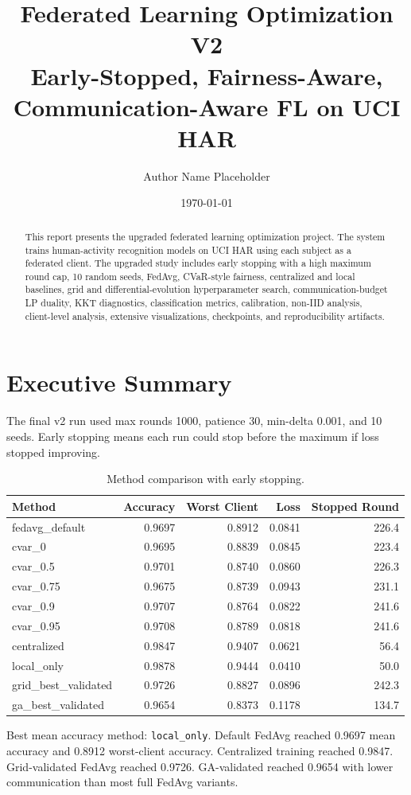 \documentclass{article}
\title{\textbf{Federated Learning Optimization V2}\\\large Early-Stopped, Fairness-Aware, Communication-Aware FL on UCI HAR}
\author{Author Name Placeholder}
\date{\today}
\begin{document}
\maketitle
\begin{abstract}This report presents the upgraded federated learning optimization project. The system trains human-activity recognition models on UCI HAR using each subject as a federated client. The upgraded study includes early stopping with a high maximum round cap, 10 random seeds, FedAvg, CVaR-style fairness, centralized and local baselines, grid and differential-evolution hyperparameter search, communication-budget LP duality, KKT diagnostics, classification metrics, calibration, non-IID analysis, client-level analysis, extensive visualizations, checkpoints, and reproducibility artifacts.\end{abstract}
\tableofcontents
\newpage
\section{Executive Summary}
The final v2 run used max rounds 1000, patience 30, min-delta 0.001, and 10 seeds. Early stopping means each run could stop before the maximum if loss stopped improving.
\begin{table}[H]\centering\begin{tabular}{lrrrr}\toprule Method & Accuracy & Worst Client & Loss & Stopped Round \\ \midrule
fedavg\_default & 0.9697 & 0.8912 & 0.0841 & 226.4 \\
cvar\_0 & 0.9695 & 0.8839 & 0.0845 & 223.4 \\
cvar\_0.5 & 0.9701 & 0.8740 & 0.0860 & 226.3 \\
cvar\_0.75 & 0.9675 & 0.8739 & 0.0943 & 231.1 \\
cvar\_0.9 & 0.9707 & 0.8764 & 0.0822 & 241.6 \\
cvar\_0.95 & 0.9708 & 0.8789 & 0.0818 & 241.6 \\
centralized & 0.9847 & 0.9407 & 0.0621 & 56.4 \\
local\_only & 0.9878 & 0.9444 & 0.0410 & 50.0 \\
grid\_best\_validated & 0.9726 & 0.8827 & 0.0896 & 242.3 \\
ga\_best\_validated & 0.9654 & 0.8373 & 0.1178 & 134.7 \\
\bottomrule\end{tabular}\caption{Method comparison with early stopping.}\end{table}
Best mean accuracy method: \texttt{local\_only}. Default FedAvg reached 0.9697 mean accuracy and 0.8912 worst-client accuracy. Centralized training reached 0.9847. Grid-validated FedAvg reached 0.9726. GA-validated reached 0.9654 with lower communication than most full FedAvg variants.
\end{document}
